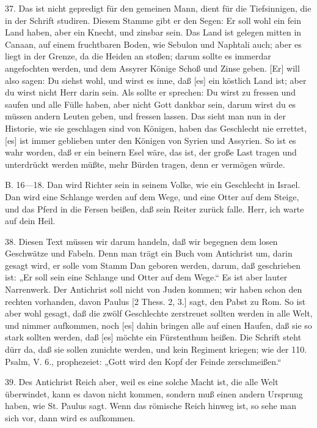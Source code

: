 37. Das ist nicht gepredigt für den gemeinen Mann, dient für die Tiefsinnigen, die in der Schrift studiren. Diesem Stamme gibt er den Segen: Er soll wohl ein fein Land haben, aber ein Knecht, und zinsbar sein. Das Land ist gelegen mitten in Canaan, auf einem fruchtbaren Boden, wie Sebulon und Naphtali auch; aber es liegt in der Grenze, da die Heiden an stoßen; darum sollte es immerdar angefochten werden, und dem Assyrer Könige Schoß und Zinse geben. [Er] will also sagen: Du siehst wohl, und wirst es inne, daß [es] ein köstlich Land ist; aber du wirst nicht Herr darin sein. Als sollte er sprechen: Du wirst zu fressen und saufen und alle Fülle haben, aber nicht Gott dankbar sein, darum wirst du es müssen andern Leuten geben, und fressen lassen. Das sieht man nun in der Historie, wie sie geschlagen sind von Königen, haben das Geschlecht nie errettet, [es] ist immer geblieben unter den Königen von Syrien und Assyrien. So ist es wahr worden, daß er ein beinern Esel wäre, das ist, der große Last tragen und unterdrückt werden müßte, mehr Bürden tragen, denn er vermögen würde.

B. 16—18. Dan wird Richter sein in seinem Volke, wie ein Geschlecht in Israel. Dan wird eine Schlange werden auf dem Wege, und eine Otter auf dem Steige, und das Pferd in die Fersen beißen, daß sein Reiter zurück falle. Herr, ich warte auf dein Heil.

38. Diesen Text müssen wir darum handeln, daß wir begegnen dem losen Geschwätze und Fabeln. Denn man trägt ein Buch vom Antichrist um, darin gesagt wird, er solle vom Stamm Dan geboren werden, darum, daß geschrieben ist: „Er soll sein eine Schlange und Otter auf dem Wege.“ Es ist aber lauter Narrenwerk. Der Antichrist soll nicht von Juden kommen; wir haben schon den rechten vorhanden, davon Paulus [2 Thess. 2, 3.] sagt, den Pabst zu Rom. So ist aber wohl gesagt, daß die zwölf Geschlechte zerstreuet sollten werden in alle Welt, und nimmer aufkommen, noch [es] dahin bringen alle auf einen Haufen, daß sie so stark sollten werden, daß [es] möchte ein Fürstenthum heißen. Die Schrift steht dürr da, daß sie sollen zunichte werden, und kein Regiment kriegen; wie der 110. Psalm, V. 6., prophezeiet: „Gott wird den Kopf der Feinde zerschmeißen.“

39. Des Antichrist Reich aber, weil es eine solche Macht ist, die alle Welt überwindet, kann es davon nicht kommen, sondern muß einen andern Ursprung haben, wie St. Paulus sagt. Wenn das römische Reich hinweg ist, so sehe man sich vor, dann wird es aufkommen.

